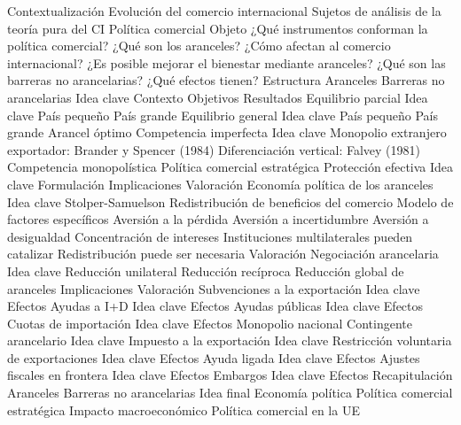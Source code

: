 \documentclass{nuevotema}
\begin{document}
\begin{esquema}[enumerate]
	\1[] 
		\2 Contextualización
			\3 Evolución del comercio internacional
			\3 Sujetos de análisis de la teoría pura del CI
			\3 Política comercial
		\2 Objeto
			\3 ¿Qué instrumentos conforman la política comercial?
			\3 ¿Qué son los aranceles?
			\3 ¿Cómo afectan al comercio internacional?
			\3 ¿Es posible mejorar el bienestar mediante aranceles?
			\3 ¿Qué son las barreras no arancelarias?
			\3 ¿Qué efectos tienen?
		\2 Estructura
			\3 Aranceles
			\3 Barreras no arancelarias
	\1 
		\2 Idea clave
			\3 Contexto
			\3 Objetivos
			\3 Resultados
		\2 Equilibrio parcial
			\3 Idea clave
			\3 País pequeño
			\3 País grande
		\2 Equilibrio general
			\3 Idea clave
			\3 País pequeño
			\3 País grande
			\3 Arancel óptimo
		\2 Competencia imperfecta
			\3 Idea clave
			\3 Monopolio extranjero exportador: Brander y Spencer (1984)
			\3 Diferenciación vertical: Falvey (1981)
			\3 Competencia monopolística
			\3 Política comercial estratégica
		\2 Protección efectiva
			\3 Idea clave
			\3 Formulación
			\3 Implicaciones
			\3 Valoración
		\2 Economía política de los aranceles
			\3 Idea clave
			\3 Stolper-Samuelson
			\3 Redistribución de beneficios del comercio
			\3 Modelo de factores específicos
			\3 Aversión a la pérdida
			\3 Aversión a incertidumbre
			\3 Aversión a desigualdad
			\3 Concentración de intereses
			\3 Instituciones multilaterales pueden catalizar
			\3 Redistribución puede ser necesaria
			\3 Valoración
		\2 Negociación arancelaria
			\3 Idea clave
			\3 Reducción unilateral
			\3 Reducción recíproca
			\3 Reducción global de aranceles
			\3 Implicaciones
			\3 Valoración
	\1 
		\2 Subvenciones a la exportación
			\3 Idea clave
			\3 Efectos
		\2 Ayudas a I+D
			\3 Idea clave
			\3 Efectos
		\2 Ayudas públicas
			\3 Idea clave
			\3 Efectos
		\2 Cuotas de importación
			\3 Idea clave
			\3 Efectos
			\3 Monopolio nacional
		\2 Contingente arancelario
			\3 Idea clave
		\2 Impuesto a la exportación
			\3 Idea clave
		\2 Restricción voluntaria de exportaciones
			\3 Idea clave
			\3 Efectos
		\2 Ayuda ligada
			\3 Idea clave
			\3 Efectos
		\2 Ajustes fiscales en frontera
			\3 Idea clave
			\3 Efectos
		\2 Embargos
			\3 Idea clave
			\3 Efectos
	\1 
		\2 Recapitulación
			\3 Aranceles
			\3 Barreras no arancelarias
		\2 Idea final
			\3 Economía política
			\3 Política comercial estratégica
			\3 Impacto macroeconómico
			\3 Política comercial en la UE

\end{esquema}
\end{document}
